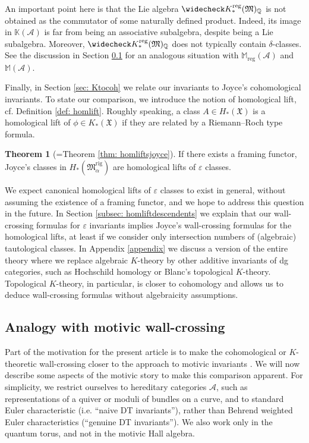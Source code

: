 \documentclass[12pt]{amsart}
\theoremstyle{definition}
\newtheorem{thm}{Theorem}
\newcommand{\BK}{{\mathbb{K}}}
\newcommand{\BM}{{\mathbb{M}}}
\newcommand{\BQ}{{\mathbb{Q}}}
\newcommand{\CA}{{\mathcal A}}
\newcommand{\1}{\mathbf 1}
\newcommand{\FM}{{\mathfrak{M}}}
\newcommand{\FX}{{\mathfrak{X}}}
\newcommand{\rig}{\mathrm{rig}}
\newcommand{\reg}{\mathrm{reg}}
\begin{document}
An important point here is that the Lie algebra $\widecheck K_\ast^\reg(\FM)_\BQ$ is not obtained as the commutator of some naturally defined product. Indeed, its image in $\BK(\CA)$ is far from being an associative subalgebra, despite being a Lie subalgebra. Moreover, $\widecheck K_\ast^\reg(\FM)_\BQ$ does not typically contain $\delta$-classes. See the discussion in Section \ref{subsec: motivic} for an analogous situation with $\BM_\reg(\CA)$ and $\BM(\CA)$. 

Finally, in Section \ref{sec: Ktocoh} we relate our invariants to Joyce's cohomological invariants. To state our comparison, we introduce the notion of homological lift, cf. Definition \ref{def: homlift}. Roughly speaking, a class $A\in H_\ast(\FX)$ is a homological lift of $\phi\in K_\ast(\FX)$ if they are related by a Riemann--Roch type formula. 

\begin{thm}[=Theorem \ref{thm: homliftsjoyce}]
If there exists a framing functor, Joyce's classes in $H_\ast(\FM_\alpha^\rig)$ are homological lifts of $\varepsilon$ classes. 
\end{thm}

We expect canonical homological lifts of $\varepsilon$ classes to exist in general, without assuming the existence of a framing functor, and we hope to address this question in the future. In Section \ref{subsec: homliftdescendents} we explain that our wall-crossing formulas for $\varepsilon$ invariants implies Joyce's wall-crossing formulas for the homological lifts, at least if we consider only intersection numbers of (algebraic) tautological classes. In Appendix \ref{appendix} we discuss a version of the entire theory where we replace algebraic $K$-theory by other additive invariants of dg categories, such as Hochschild homology or Blanc's topological $K$-theory. Topological $K$-theory, in particular, is closer to cohomology and allows us to deduce wall-crossing formulas without algebraicity assumptions. 



\subsection{Analogy with motivic wall-crossing}
\label{subsec: motivic}

Part of the motivation for the present article is to make the cohomological or $K$-theoretic wall-crossing \cite{joyce, Liu} closer to the approach to motivic invariants \cite{JO06III, JO06I, JS12, KS08, bridgelandHallsurvey}. We will now describe some aspects of the motivic story to make this comparison apparent. For simplicity, we restrict ourselves to hereditary categories $\CA$, such as representations of a quiver or moduli of bundles on a curve, and to standard Euler characteristic (i.e. ``naive DT invariants''), rather than Behrend weighted Euler characteristics (``genuine DT invariants''). We also work only in the quantum torus, and not in the motivic Hall algebra.
\end{document}
